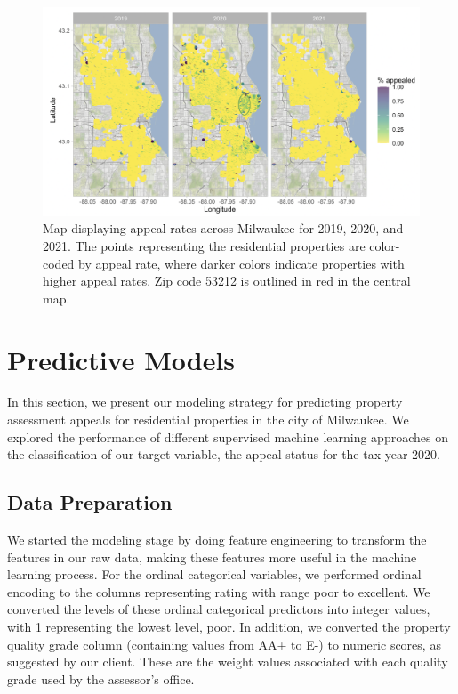 \documentclass[
  12pt,
]{article}
\begin{document}
\begin{figure}[H]

{\centering \includegraphics[width=0.9\linewidth]{latlong} 

}

\caption{Map displaying appeal rates across Milwaukee for 2019, 2020, and 2021. The points representing the residential properties are color-coded by appeal rate, where darker colors indicate properties with higher appeal rates. Zip code 53212 is outlined in red in the central map.}\label{fig:unnamed-chunk-6}
\end{figure}

\hypertarget{predictive-models}{%
\section{Predictive Models}\label{predictive-models}}

In this section, we present our modeling strategy for predicting
property assessment appeals for residential properties in the city of
Milwaukee. We explored the performance of different supervised machine
learning approaches on the classification of our target variable, the
appeal status for the tax year 2020.

\hypertarget{data-preparation}{%
\subsection{Data Preparation}\label{data-preparation}}

We started the modeling stage by doing feature engineering to transform
the features in our raw data, making these features more useful in the
machine learning process. For the ordinal categorical variables, we
performed ordinal encoding to the columns representing rating with range
poor to excellent. We converted the levels of these ordinal categorical
predictors into integer values, with 1 representing the lowest level,
poor. In addition, we converted the property quality grade column
(containing values from AA+ to E-) to numeric scores, as suggested by
our client. These are the weight values associated with each quality
grade used by the assessor's office.
\end{document}
